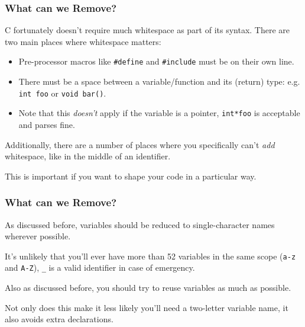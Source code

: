 \documentclass[xcolor]{beamer}
\begin{document}
\begin{frame}
	\frametitle{What can we Remove?}
	\pause
	
	C fortunately doesn't require much whitespace as part of its syntax. \pause There are two main places where whitespace matters:
	\pause

	\begin{itemize}
		\item Pre-processor macros like \texttt{\#define} and \texttt{\#include} must be on their own line.
		\pause
		
		\item There must be a space between a variable/function and its (return) type: e.g. \texttt{int foo} or \texttt{void bar()}.
		\pause
		
		\item Note that this \textit{doesn't} apply if the variable is a pointer, \texttt{int*foo} is acceptable and parses fine.
	\end{itemize}
	\pause

	Additionally, there are a number of places where you specifically can't \textit{add} whitespace, like in the middle of an identifier.
	\pause
	
	This is important if you want to shape your code in a particular way.
\end{frame}

\begin{frame}
	\frametitle{What can we Remove?}
	\pause
	
	As discussed before, variables should be reduced to single-character names wherever possible.
	\pause
	
	It's unlikely that you'll ever have more than 52 variables in the same scope (\texttt{a-z} and \texttt{A-Z}), \pause \texttt{\_} is a valid identifier in case of emergency.
	\pause

	Also as discussed before, you should try to reuse variables as much as possible.
	\pause
	
	Not only does this make it less likely you'll need a two-letter variable name, it also avoids extra declarations.
\end{frame}
\end{document}

